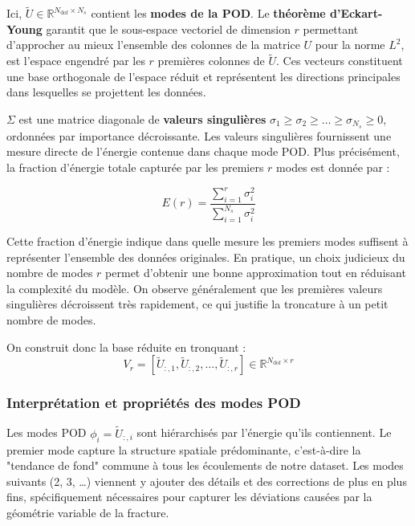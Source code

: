 \documentclass[12pt,a4paper]{article}
\begin{document}
Ici, $\tilde{U} \in \mathbb{R}^{N_{\text{dof}} \times N_s}$ contient les \textbf{modes de la POD}. Le \textbf{théorème d'Eckart-Young} garantit que le sous-espace vectoriel de dimension $r$ permettant d'approcher au mieux l'ensemble des colonnes de la matrice $U$ pour la norme $L^2$, est l'espace engendré par les $r$ premières colonnes de $\tilde{U}$. Ces vecteurs constituent une base orthogonale de l'espace réduit et représentent les directions principales dans lesquelles se projettent les données.


$\Sigma$ est une matrice diagonale de \textbf{valeurs singulières} $\sigma_1 \geq \sigma_2 \geq \ldots \geq \sigma_{N_s} \geq 0$, ordonnées par importance décroissante. Les valeurs singulières fournissent une mesure directe de l'énergie contenue dans chaque mode POD. Plus précisément, la fraction d'énergie totale capturée par les premiers $r$ modes est donnée par :
 
\begin{equation*}
    E(r)=\frac{\sum_{i=1}^{r} \sigma_i^2}{\sum_{i=1}^{N_s} \sigma_i^2}
\end{equation*}

Cette fraction d'énergie indique dans quelle mesure les premiers modes suffisent à représenter l'ensemble des données originales. En pratique, un choix judicieux du nombre de modes $r$ permet d'obtenir une bonne approximation tout en réduisant la complexité du modèle. On observe généralement que les premières valeurs singulières décroissent très rapidement, ce qui justifie la troncature à un petit nombre de modes.

On construit donc la base réduite en tronquant :
\begin{equation*}
    V_r = [\tilde{U}_{:,1}, \tilde{U}_{:,2}, \ldots, \tilde{U}_{:,r}] \in \mathbb{R}^{N_{\text{dof}} \times r}
\end{equation*}

\subsubsection{Interprétation et propriétés des modes POD}

 
Les modes POD $\phi_i = \tilde{U}_{:,i}$ sont hiérarchisés par l'énergie qu'ils contiennent. Le premier mode capture la structure spatiale prédominante, c'est-à-dire la "tendance de fond" commune à tous les écoulements de notre dataset. Les modes suivants (2, 3, \dots) viennent y ajouter des détails et des corrections de plus en plus fins, spécifiquement nécessaires pour capturer les déviations causées par la géométrie variable de la fracture.
 
\end{document}
